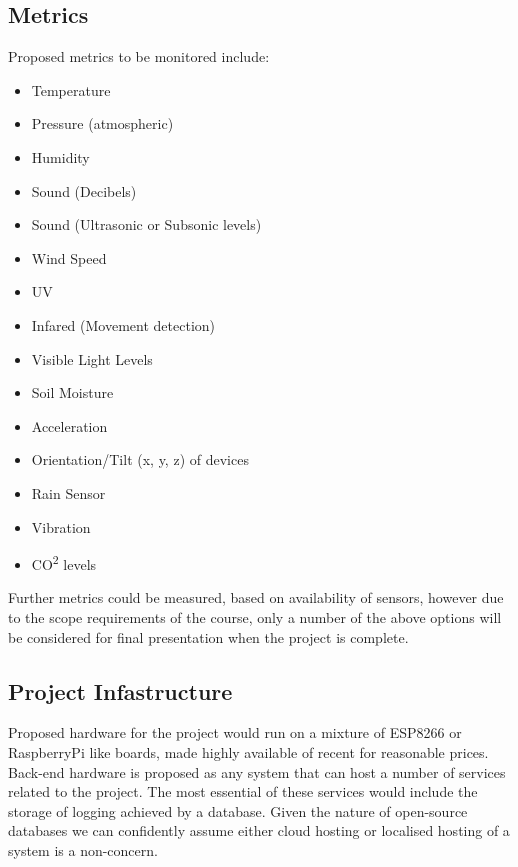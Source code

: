\documentclass{article}
\begin{document}
        \subsection{Metrics}
        Proposed metrics to be monitored include:
        \begin{itemize}
            \item Temperature
            \item Pressure (atmospheric)
            \item Humidity
            \item Sound (Decibels)
            \item Sound (Ultrasonic or Subsonic levels)
            \item Wind Speed
            \item UV 
            \item Infared (Movement detection)
            \item Visible Light Levels
            \item Soil Moisture
            \item Acceleration
            \item Orientation/Tilt (x, y, z) of devices
            \item Rain Sensor
            \item Vibration
            \item CO\textsuperscript{2} levels
        \end{itemize}
        Further metrics could be measured, based on availability of sensors, however due to 
        the scope requirements of the course, only a number of the above options will be considered
        for final presentation when the project is complete.

        \pagebreak

        \subsection{Project Infastructure}
        Proposed hardware for the project would run on a mixture of ESP8266\cite{ESP8266} or
        RaspberryPi like boards, made highly available of recent for reasonable prices.
        \\
        Back-end hardware is proposed as any system that can host a number of services related
        to the project. The most essential of these services would include the storage of logging
        achieved by a database. Given the nature of open-source databases we can confidently assume either
        cloud hosting or localised hosting of a system is a non-concern.
\end{document}
